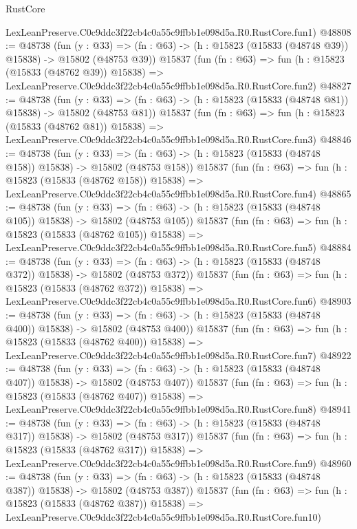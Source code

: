 \begin{lexlean}{RustCore}
\begin{coremodule}
    LexLeanPreserve.C0c9ddc3f22cb4c0a55c9ffbb1e098d5a.R0.RustCore.fun1)
@48808 := @48738
    (fun (y : @33) =>
    (fn : @63) -> (h : @15823 (@15833 (@48748 @39)) @15838) -> @15802 (@48753 @39))
    @15837
    (fun (fn : @63) =>
    fun (h : @15823 (@15833 (@48762 @39)) @15838) =>
    LexLeanPreserve.C0c9ddc3f22cb4c0a55c9ffbb1e098d5a.R0.RustCore.fun2)
@48827 := @48738
    (fun (y : @33) =>
    (fn : @63) -> (h : @15823 (@15833 (@48748 @81)) @15838) -> @15802 (@48753 @81))
    @15837
    (fun (fn : @63) =>
    fun (h : @15823 (@15833 (@48762 @81)) @15838) =>
    LexLeanPreserve.C0c9ddc3f22cb4c0a55c9ffbb1e098d5a.R0.RustCore.fun3)
@48846 := @48738
    (fun (y : @33) =>
    (fn : @63) -> (h : @15823 (@15833 (@48748 @158)) @15838) -> @15802 (@48753 @158))
    @15837
    (fun (fn : @63) =>
    fun (h : @15823 (@15833 (@48762 @158)) @15838) =>
    LexLeanPreserve.C0c9ddc3f22cb4c0a55c9ffbb1e098d5a.R0.RustCore.fun4)
@48865 := @48738
    (fun (y : @33) =>
    (fn : @63) -> (h : @15823 (@15833 (@48748 @105)) @15838) -> @15802 (@48753 @105))
    @15837
    (fun (fn : @63) =>
    fun (h : @15823 (@15833 (@48762 @105)) @15838) =>
    LexLeanPreserve.C0c9ddc3f22cb4c0a55c9ffbb1e098d5a.R0.RustCore.fun5)
@48884 := @48738
    (fun (y : @33) =>
    (fn : @63) -> (h : @15823 (@15833 (@48748 @372)) @15838) -> @15802 (@48753 @372))
    @15837
    (fun (fn : @63) =>
    fun (h : @15823 (@15833 (@48762 @372)) @15838) =>
    LexLeanPreserve.C0c9ddc3f22cb4c0a55c9ffbb1e098d5a.R0.RustCore.fun6)
@48903 := @48738
    (fun (y : @33) =>
    (fn : @63) -> (h : @15823 (@15833 (@48748 @400)) @15838) -> @15802 (@48753 @400))
    @15837
    (fun (fn : @63) =>
    fun (h : @15823 (@15833 (@48762 @400)) @15838) =>
    LexLeanPreserve.C0c9ddc3f22cb4c0a55c9ffbb1e098d5a.R0.RustCore.fun7)
@48922 := @48738
    (fun (y : @33) =>
    (fn : @63) -> (h : @15823 (@15833 (@48748 @407)) @15838) -> @15802 (@48753 @407))
    @15837
    (fun (fn : @63) =>
    fun (h : @15823 (@15833 (@48762 @407)) @15838) =>
    LexLeanPreserve.C0c9ddc3f22cb4c0a55c9ffbb1e098d5a.R0.RustCore.fun8)
@48941 := @48738
    (fun (y : @33) =>
    (fn : @63) -> (h : @15823 (@15833 (@48748 @317)) @15838) -> @15802 (@48753 @317))
    @15837
    (fun (fn : @63) =>
    fun (h : @15823 (@15833 (@48762 @317)) @15838) =>
    LexLeanPreserve.C0c9ddc3f22cb4c0a55c9ffbb1e098d5a.R0.RustCore.fun9)
@48960 := @48738
    (fun (y : @33) =>
    (fn : @63) -> (h : @15823 (@15833 (@48748 @387)) @15838) -> @15802 (@48753 @387))
    @15837
    (fun (fn : @63) =>
    fun (h : @15823 (@15833 (@48762 @387)) @15838) =>
    LexLeanPreserve.C0c9ddc3f22cb4c0a55c9ffbb1e098d5a.R0.RustCore.fun10)

\end{coremodule}
\end{lexlean}
